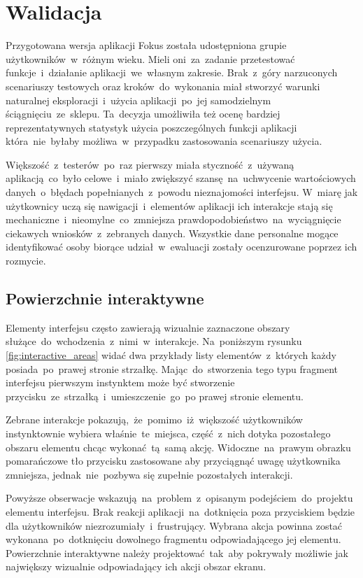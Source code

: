 \section{Walidacja}
Przygotowana wersja aplikacji Fokus została udostępniona grupie użytkowników~w~różnym wieku. Mieli oni~za~zadanie przetestować funkcje~i~działanie aplikacji~we~własnym zakresie. Brak~z~góry narzuconych scenariuszy testowych oraz kroków~do~wykonania miał stworzyć warunki naturalnej eksploracji~i~użycia aplikacji~po~jej samodzielnym ściągnięciu~ze~sklepu. Ta~decyzja umożliwiła też ocenę bardziej reprezentatywnych statystyk użycia poszczególnych funkcji aplikacji która~nie~byłaby możliwa~w~przypadku zastosowania scenariuszy użycia. 

Większość~z~testerów~po~raz pierwszy miała styczność~z~używaną aplikacją~co~było celowe~i~miało zwiększyć szansę~na~uchwycenie wartościowych danych~o~błędach popełnianych~z~powodu nieznajomości interfejsu. W~miarę jak użytkownicy uczą się nawigacji~i~elementów aplikacji ich interakcje stają się mechaniczne~i~nieomylne~co~zmniejsza prawdopodobieństwo~na~wyciągnięcie ciekawych wniosków~z~zebranych danych. Wszystkie dane personalne mogące identyfikować osoby biorące udział~w~ewaluacji zostały ocenzurowane poprzez ich rozmycie.

\subsection{Powierzchnie interaktywne}
Elementy interfejsu często zawierają wizualnie zaznaczone obszary służące~do~wchodzenia~z~nimi~w~interakcje. Na~poniższym rysunku \ref{fig:interactive_areas} widać dwa przykłady listy elementów~z~których każdy posiada~po~prawej stronie strzałkę. Mając~do~stworzenia tego typu fragment interfejsu pierwszym instynktem może być stworzenie przycisku~ze~strzałką~i~umieszczenie~go~po prawej stronie elementu.

Zebrane interakcje pokazują,~że~pomimo~iż~większość użytkowników instynktownie wybiera właśnie~te~miejsca, część~z~nich dotyka pozostałego obszaru elementu chcąc wykonać~tą~samą akcję. Widoczne~na~prawym obrazku pomarańczowe tło przycisku zastosowane aby przyciągnąć uwagę użytkownika zmniejsza, jednak~nie~pozbywa się zupełnie pozostałych interakcji. 

Powyższe obserwacje wskazują~na~problem~z~opisanym podejściem~do~projektu elementu interfejsu. Brak reakcji aplikacji~na~dotknięcia poza przyciskiem będzie dla użytkowników niezrozumiały~i~frustrujący. Wybrana akcja powinna zostać wykonana~po~dotknięciu dowolnego fragmentu odpowiadającego jej elementu. Powierzchnie interaktywne należy projektować~tak~aby pokrywały możliwie jak największy wizualnie odpowiadający ich akcji obszar ekranu.

